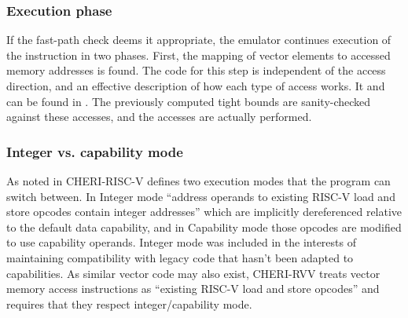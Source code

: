 \subsubsection{Execution phase}
If the fast-path check deems it appropriate, the emulator continues execution of the instruction in two phases.
First, the mapping of vector elements to accessed memory addresses is found.
The code for this step is independent of the access direction, and an effective description of how each type of access works.
It and can be found in .
The previously computed tight bounds are sanity-checked against these accesses, and the accesses are actually performed.

\subsubsection{Integer vs. capability mode}\label{chap:emu:rvv_int_mode}
As noted in  CHERI-RISC-V defines two execution modes that the program can switch between.
In Integer mode \enquote{address operands to existing RISC-V load and store opcodes contain integer addresses} which are implicitly dereferenced relative to the default data capability, and in Capability mode those opcodes are modified to use capability operands.
Integer mode was included in the interests of maintaining compatibility with legacy code that hasn't been adapted to capabilities.
As similar vector code may also exist, CHERI-RVV treats vector memory access instructions as \enquote{existing RISC-V load and store opcodes} and requires that they respect integer/capability mode.